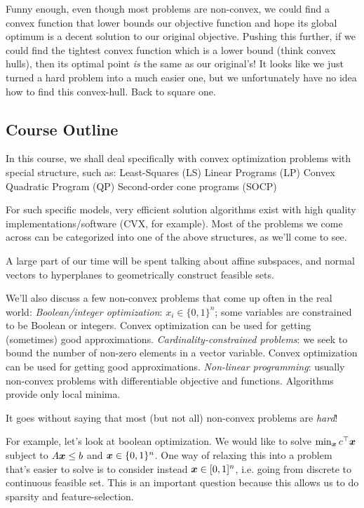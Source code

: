 \documentclass[11 pt]{scrartcl}
\begin{document}
Funny enough, even though most problems are non-convex, we could find a convex function that lower bounds our objective function and hope its global optimum is a decent solution to our original objective. 
Pushing this further, if we could find the tightest convex function which is a lower bound (think convex hulls), then its optimal point \emph{is} the same as our original's! 
It looks like we just turned a hard problem into a much easier one, but we unfortunately have no idea how to find this convex-hull. 
Back to square one. 

\subsection{Course Outline}

In this course, we shall deal specifically with convex optimization problems with special structure, such as: 
\itemnum
    \ii Least-Squares (LS)
    \ii Linear Programs (LP)
    \ii Convex Quadratic Program (QP)
    \ii Second-order cone programs (SOCP)
\itemend

For such specific models, very efficient solution algorithms exist with high quality implementations/software (CVX, for example). 
Most of the problems we come across can be categorized into one of the above structures, as we'll come to see. 

A large part of our time will be spent talking about affine subspaces, and normal vectors to hyperplanes to geometrically construct feasible sets. 

We'll also discuss a few non-convex problems that come up often in the real world: 
\itemnum
    \ii \emph{Boolean/integer optimization}: $x_i\in \{0,1\}^n$; some variables are constrained to be Boolean or integers. Convex optimization can be used for getting (sometimes) good approximations. 
    \ii \emph{Cardinality-constrained problems}: we seek to bound the number of non-zero elements in a vector variable. Convex optimization can be used for getting good approximations. 
    \ii \emph{Non-linear programming}: usually non-convex problems with differentiable objective and functions. Algorithms provide only local minima. 
\itemend

It goes without saying that most (but not all) non-convex problems are \emph{hard}!

For example, let's look at boolean optimization. We would like to solve $\min_{{\bm{x}}} c^\top {\bm{x}}$ subject to $A{\bm{x}} \leq b$ and ${\bm{x}}\in \{0,1\}^n$. 
One way of relaxing this into a problem that's easier to solve is to consider instead ${\bm{x}} \in [0,1]^n$, i.e. going from discrete to continuous feasible set.
This is an important question because this allows us to do sparsity and feature-selection. 
\end{document}
